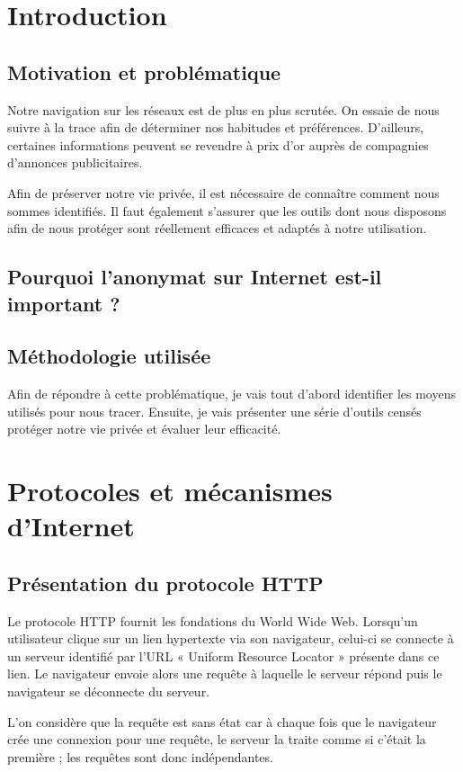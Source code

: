 \documentclass[a4paper,12pt,french]{report}
\begin{document}
\tableofcontents

\chapter{Introduction}
\section{Motivation et problématique}
Notre navigation sur les réseaux est de plus en plus scrutée. On essaie de nous suivre à la trace afin de déterminer nos habitudes et préférences. D'ailleurs, certaines informations peuvent se revendre à prix d'or auprès de compagnies d'annonces publicitaires.

Afin de préserver notre vie privée, il est nécessaire de connaître comment nous sommes identifiés. Il faut également s'assurer que les outils dont nous disposons afin de nous protéger sont réellement efficaces et adaptés à notre utilisation.

\section{Pourquoi l'anonymat sur Internet est-il important ?}

\section{Méthodologie utilisée}
Afin de répondre à cette problématique, je vais tout d'abord identifier les moyens utilisés pour nous tracer. Ensuite, je vais présenter une série d'outils censés protéger notre vie privée et évaluer leur efficacité.


\chapter{Protocoles et mécanismes d'Internet}
\section{Présentation du protocole HTTP}
Le protocole HTTP fournit les fondations du World Wide Web. Lorsqu'un utilisateur clique sur un lien hypertexte via son navigateur, celui-ci se connecte à un serveur identifié par l'URL « Uniform Resource Locator » présente dans ce lien. Le navigateur envoie alors une requête à laquelle le serveur répond puis le navigateur se déconnecte du serveur.

L'on considère que la requête est sans état car à chaque fois que le navigateur crée une connexion pour une requête, le serveur la traite comme si c'était la première ; les requêtes sont donc indépendantes.
\end{document}
